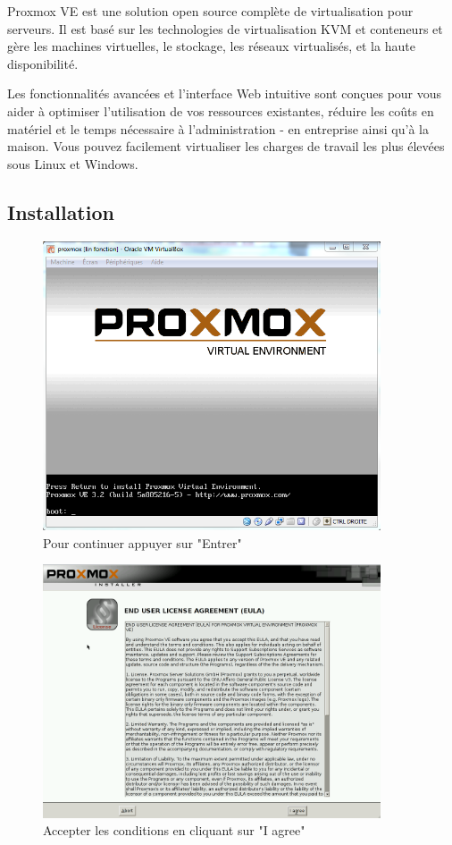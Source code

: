 \documentclass[12pt,a4paper]{article}
\begin{document}
Proxmox VE est une solution open source complète de virtualisation pour serveurs. Il est basé sur les technologies de virtualisation KVM et conteneurs et gère les machines virtuelles, le stockage, les réseaux virtualisés, et la haute disponibilité.

Les fonctionnalités avancées et l'interface Web intuitive sont conçues pour vous aider à optimiser l'utilisation de vos ressources existantes, réduire les coûts en matériel et le temps nécessaire à l'administration - en entreprise ainsi qu'à la maison. Vous pouvez facilement virtualiser les charges de travail les plus élevées sous Linux et Windows.

\subsection{Installation}

\begin{figure}[!ht]
\center
\includegraphics[width=10cm]{Images/1.PNG} 
\caption{Pour continuer appuyer sur "Entrer"}
\end{figure}


\begin{figure}[!ht]
\center
\includegraphics[width=10cm]{Images/2.PNG} 
\caption{Accepter les conditions en cliquant sur "I agree"}
\end{figure}
\end{document}
